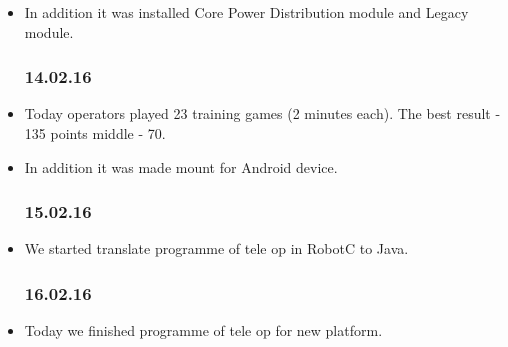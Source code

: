 \begin{itemize}
		\item In addition it was installed Core Power Distribution module and Legacy module.
	 	
	\subsubsection{14.02.16}
		\item Today operators played 23 training games (2 minutes each). The best result - 135 points middle - 70.
		
		\item In addition it was made mount for Android device.
	\subsubsection{15.02.16}
		\item We started translate programme of tele op in RobotC to Java.	
	\subsubsection{16.02.16}
		\item Today we finished programme of tele op for new platform.	
\end{itemize}		
\fillpage